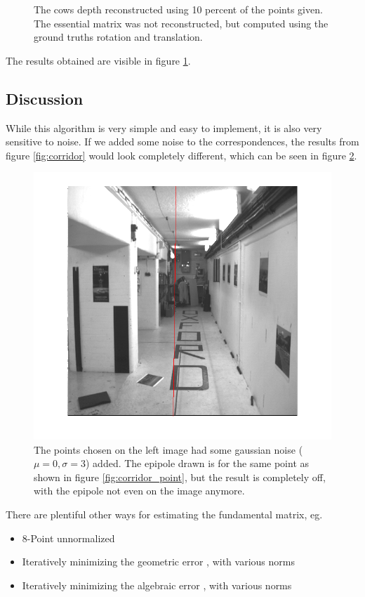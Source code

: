 \documentclass{paper}
\begin{document}
\begin{figure}
\begin{subfigure}{0.3\textwidth}
\end{subfigure}
\caption{The cows depth reconstructed using 10 percent of the points given.
The essential matrix was not reconstructed, but computed using the ground
truths rotation and translation.}
\label{fig:cow}
\end{figure}
The results obtained are visible in figure \ref{fig:cow}.
\subsection{Discussion}
While this algorithm is very simple and easy to implement, it is also very sensitive
to noise. If we added some noise to the correspondences, the results from figure \ref{fig:corridor} would look completely different, 
which can be seen in figure \ref{fig:corridor_noisy}.
\begin{figure}[h]
\centering
   \includegraphics[width=\textwidth]{corridor_eline_noisy}
\caption{The points chosen on the left image had some gaussian noise 
($\mu = 0, \sigma = 3$) added. The epipole drawn is for
the same point as shown in figure 
\ref{fig:corridor_point},
 but the result is completely off, with the epipole not even
on the image anymore.}
\label{fig:corridor_noisy}
\end{figure}
 There are plentiful other ways for estimating the fundamental matrix, eg.
\begin{itemize}
\item 8-Point unnormalized
\item Iteratively minimizing the geometric error \cite{Hartley2004}, with various norms
\item Iteratively minimizing the algebraic error \cite{Hartley2004}, with various norms
\end{itemize}
\end{document}
